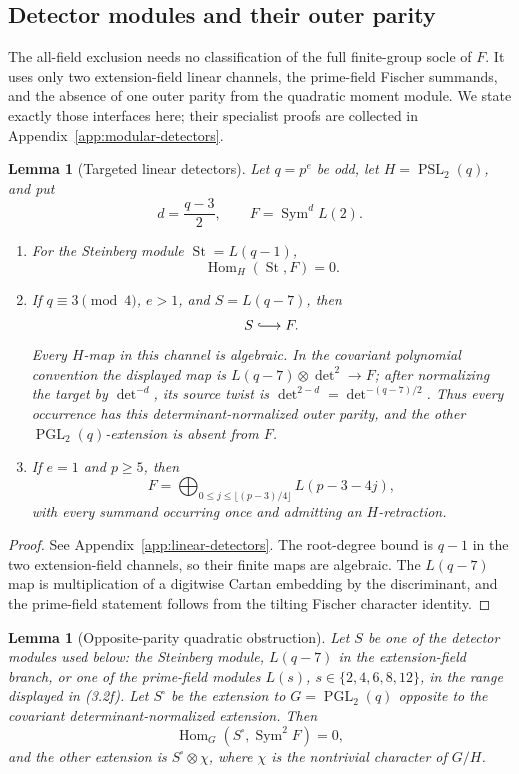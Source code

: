 \documentclass[11pt]{article}
\newtheorem{lemma}[theorem]{Lemma}
\theoremstyle{definition}
\theoremstyle{remark}
\begin{document}
\subsection{Detector modules and their outer parity}

The all-field exclusion needs no classification of the full finite-group
socle of \(F\).  It uses only two extension-field linear channels, the
prime-field Fischer summands, and the absence of one outer parity from the
quadratic moment module.  We state exactly those interfaces here; their
specialist proofs are collected in
Appendix~\ref{app:modular-detectors}.

\begin{lemma}[Targeted linear detectors]
\label{lem:targeted-linear-detectors}
Let \(q=p^e\) be odd, let \(H=\operatorname{PSL}_2(q)\), and put
\[
 d=\frac{q-3}{2},\qquad F=\operatorname{Sym}^{d}L(2).
\]
\begin{enumerate}
\item For the Steinberg module \(\operatorname{St}=L(q-1)\),
\[
 \operatorname{Hom}_H(\operatorname{St},F)=0.
\]
\item If \(q\equiv3\pmod4\), \(e>1\), and \(S=L(q-7)\), then
\[
 S\lhook\joinrel\longrightarrow F.
\]
Every \(H\)-map in this channel is algebraic.  In the covariant
polynomial convention the displayed map is
\(L(q-7)\otimes\det^2\to F\); after normalizing the target by
\(\det^{-d}\), its source twist is
\(\det^{2-d}=\det^{-(q-7)/2}\).  Thus every occurrence has this
determinant-normalized outer parity, and the other
\(\operatorname{PGL}_2(q)\)-extension is absent from \(F\).
\item If \(e=1\) and \(p\geq5\), then
\[
 F=\bigoplus_{0\leq j\leq\lfloor(p-3)/4\rfloor}
       L(p-3-4j),
\]
with every summand occurring once and admitting an \(H\)-retraction.
\end{enumerate}
\end{lemma}

\begin{proof}
See Appendix~\ref{app:linear-detectors}.  The root-degree bound is
\(q-1\) in the two extension-field channels, so their finite maps are
algebraic.  The \(L(q-7)\) map is multiplication of a digitwise Cartan
embedding by the discriminant, and the prime-field statement follows from
the tilting Fischer character identity.
\end{proof}

\begin{lemma}[Opposite-parity quadratic obstruction]
\label{lem:opposite-parity-quadratic}
Let \(S\) be one of the detector modules used below: the Steinberg module,
\(L(q-7)\) in the extension-field branch, or one of the prime-field modules
\(L(s)\), \(s\in\{2,4,6,8,12\}\), in the range displayed in (3.2f).
Let \(S^\square\) be the extension to
\(G=\operatorname{PGL}_2(q)\) opposite to the covariant
determinant-normalized extension.  Then
\[
 \operatorname{Hom}_G(S^\square,\operatorname{Sym}^2F)=0,
\]
and the other extension is \(S^\square\otimes\chi\), where \(\chi\) is
the nontrivial character of \(G/H\).
\end{lemma}
\end{document}
